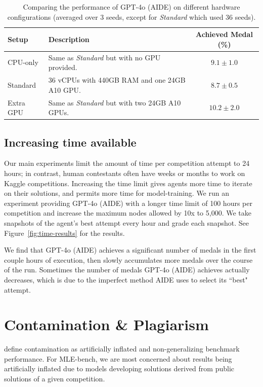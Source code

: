 \documentclass{article} %
\begin{document}
\begin{table}[htb]
    \caption{Comparing the performance of GPT-4o (AIDE) on different hardware configurations (averaged over 3 seeds, except for \textit{Standard} which used 36 seeds).}
    \centering
    \begin{tabular}{l p{8cm} c}
        \toprule
        \textbf{Setup} & \textbf{Description} & \textbf{Achieved Medal (\%)} \\
        \midrule
        CPU-only & Same as \textit{Standard} but with no GPU provided. & $9.1 \pm 1.0$ \\
        Standard & 36 vCPUs with 440GB RAM and one 24GB A10 GPU. & $8.7 \pm 0.5$\\
        Extra GPU & Same as \textit{Standard} but with two 24GB A10 GPUs. & $10.2 \pm 2.0$ \\
        \bottomrule
    \end{tabular}

    \label{tab:hardware-results}
\end{table}

\subsection{Increasing time available}
Our main experiments limit the amount of time per competition attempt to 24 hours; in contrast, human contestants often have weeks or months to work on Kaggle competitions. Increasing the time limit gives agents more time to iterate on their solutions, and permits more time for model-training. We run an experiment providing GPT-4o (AIDE) with a longer time limit of 100 hours per competition and increase the maximum nodes allowed by 10x to 5,000. We take snapshots of the agent’s best attempt every hour and grade each snapshot. See Figure~\ref{fig:time-results} for the results.

We find that GPT-4o (AIDE) achieves a significant number of medals in the first couple hours of execution, then slowly accumulates more medals over the course of the run. Sometimes the number of medals GPT-4o (AIDE) achieves actually decreases, which is due to the imperfect method AIDE uses to select its ``best" attempt.

\section{Contamination \& Plagiarism}
\label{sec:contamination_plagiarism}

\cite{dekoninck_constat_2024} define contamination as artificially inflated and non-generalizing benchmark performance. For MLE-bench, we are most concerned about results being artificially inflated due to models developing solutions derived from public solutions of a given competition.
\end{document}
